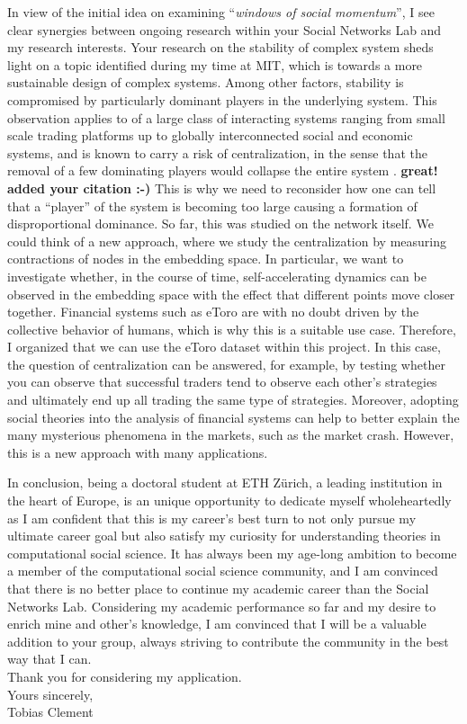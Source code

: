 In view of the initial idea on examining ``\textit{windows of social momentum}'', I see clear synergies between ongoing research within your Social Networks Lab and my research interests. 
Your research on the stability of complex system sheds light on a topic identified during my time at MIT, which is towards a more sustainable design of complex systems.
Among other factors, stability is compromised by particularly dominant players in the underlying system.
This observation applies to of a large class of interacting systems ranging from small scale trading platforms up to globally interconnected social and economic systems, and is known to carry a risk of centralization, in the sense that the removal of a few dominating players would collapse the entire system \cite{lera2017prediction}. \textbf{great! added your citation :-)}
This is why we need to reconsider how one can tell that a ``player'' of the system is becoming too large causing a formation of disproportional dominance. 
So far, this was studied on the network itself. 
We could think of a new approach, where we study the centralization by measuring contractions of nodes in the embedding space.
In particular, we want to investigate whether, in the course of time, self-accelerating dynamics can be observed in the embedding space with the effect that different points move closer together.
Financial systems such as eToro are with no doubt driven by the collective behavior of humans, which is why this is a suitable use case.
Therefore, I organized that we can use the eToro dataset within this project.  
In this case, the question of centralization can be answered, for example, by testing whether you can observe that successful traders tend to observe each other's strategies and ultimately end up all trading the same type of strategies.
Moreover, adopting social theories into the analysis of financial systems can help to better explain the many mysterious phenomena in the markets, such as the market crash. 
However, this is a new approach with many applications.\\


In conclusion, being a doctoral student at ETH Zürich, a leading institution in the heart of Europe, is an unique opportunity to dedicate myself wholeheartedly as I am confident that this is my career's best turn to not only pursue my ultimate career goal but also satisfy my curiosity for understanding theories in computational social science. 
It has always been my age-long ambition to become a member of the computational social science community, and I am convinced that there is no better place to continue my academic career than the Social Networks Lab. 
Considering my academic performance so far and my desire to enrich mine and other's knowledge, I am convinced that I will be a valuable addition to your group, always striving to contribute the community in the best way that I can.\\

Thank you for considering my application.\\

Yours sincerely,\\
Tobias Clement\\\\\
